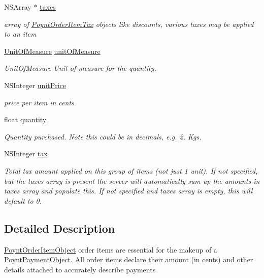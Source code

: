 \begin{DoxyCompactItemize}
N\+S\+Array $\ast$ \hyperlink{interface_poynt_order_item_object_a24101b932074a386b535ab58e819bf71}{taxes}
\begin{DoxyCompactList}\small\item\em array of \hyperlink{interface_poynt_order_item_tax}{Poynt\+Order\+Item\+Tax} objects  like discounts, various taxes may be applied to an item \end{DoxyCompactList}\item 
\hyperlink{_poynt_order_item_object_8h_a7a5dd044bd57739d1d1b3e3565fbac25}{Unit\+Of\+Measure} \hyperlink{interface_poynt_order_item_object_a8381a2b60fb912bab67a5218ba3ad058}{unit\+Of\+Measure}
\begin{DoxyCompactList}\small\item\em Unit\+Of\+Measure  Unit of measure for the quantity. \end{DoxyCompactList}\item 
N\+S\+Integer \hyperlink{interface_poynt_order_item_object_a4655acbe158688f583828a9a3b61a6aa}{unit\+Price}
\begin{DoxyCompactList}\small\item\em price per item in cents \end{DoxyCompactList}\item 
float \hyperlink{interface_poynt_order_item_object_ab39715c10682638e342e25893caa7372}{quantity}
\begin{DoxyCompactList}\small\item\em Quantity purchased.  Note this could be in decimals, e.\+g. 2. Kgs. \end{DoxyCompactList}\item 
N\+S\+Integer \hyperlink{interface_poynt_order_item_object_a23a4b2c80d04d250fb56741b46a2cb0d}{tax}
\begin{DoxyCompactList}\small\item\em Total tax amount applied on this group of items (not just 1 unit).  If not specified, but the taxes array is present the server will automatically sum up the amounts in taxes array and populate this. If not specified and taxes array is empty, this will default to 0. \end{DoxyCompactList}\end{DoxyCompactItemize}


\subsection{Detailed Description}
\hyperlink{interface_poynt_order_item_object}{Poynt\+Order\+Item\+Object}  order items are essential for the makeup of a \hyperlink{interface_poynt_payment_object}{Poynt\+Payment\+Object}. All order items declare their amount (in cents) and other details attached to accurately describe payments


